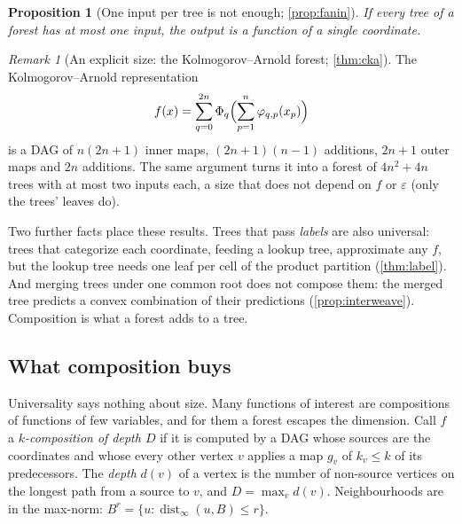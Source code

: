 \documentclass[11pt]{article}
\newtheorem{proposition}[theorem]{Proposition}
\theoremstyle{definition}
\theoremstyle{remark}
\newtheorem{remark}[theorem]{Remark}
\begin{document}
\begin{proposition}[One input per tree is not enough; \cref{prop:fanin}]\label{prop:fanin-main}
If every tree of a forest has at most one input, the output is a function of a single
coordinate.
\end{proposition}

\begin{remark}[An explicit size: the Kolmogorov--Arnold forest; \cref{thm:cka}]\label{rem:ka-main}
The Kolmogorov--Arnold representation
\begin{equation}\label{eq:ka}
  f(x)=\sum_{q=0}^{2n}\Phi_q\Bigl(\sum_{p=1}^n\varphi_{q,p}(x_p)\Bigr)
\end{equation}
is a DAG of
$n(2n+1)$ inner maps, $(2n+1)(n-1)$ additions, $2n+1$ outer maps and $2n$ additions.  The
same argument turns it into a forest of $4n^2+4n$ trees with at most two inputs each, a
size that does not depend on $f$ or $\varepsilon$ (only the trees' leaves do).
\end{remark}

Two further facts place these results.  Trees that pass \emph{labels} are also universal:
trees that categorize each coordinate, feeding a lookup tree, approximate any $f$, but the
lookup tree needs one leaf per cell of the product partition (\cref{thm:label}).  And
merging trees under one common root does not compose them: the merged tree predicts a
convex combination of their predictions (\cref{prop:interweave}).  Composition is what a
forest adds to a tree.

\subsection{What composition buys}

Universality says nothing about size.  Many functions of interest are compositions of
functions of few variables, and for them a forest escapes the dimension.  Call $f$ a
\emph{$k$-composition of depth $D$} if it is computed by a DAG whose sources are the
coordinates and whose every other vertex $v$ applies a map $g_v$ of $k_v\le k$ of its
predecessors.  The \emph{depth} $d(v)$ of a vertex is the number of non-source vertices on the
longest path from a source to $v$, and $D=\max_vd(v)$.  Neighbourhoods are in the max-norm:
$B^{r}=\{u:\operatorname{dist}_\infty(u,B)\le r\}$.
\end{document}
